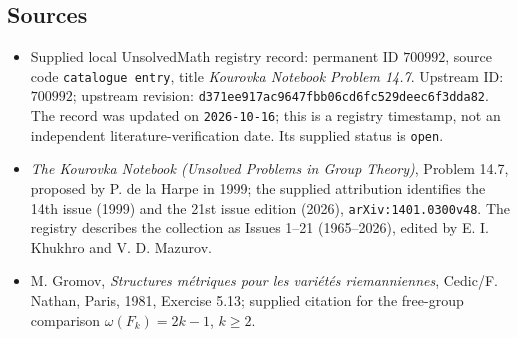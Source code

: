 \documentclass[11pt]{article}
\begin{document}
\subsection{Sources}
\begin{itemize}
\item Supplied local UnsolvedMath registry record: permanent ID \(700992\), source code \texttt{catalogue entry}, title \emph{Kourovka Notebook Problem 14.7}. Upstream ID: \(700992\); upstream revision: \texttt{d371ee917ac9647fbb06cd6fc529deec6f3dda82}. The record was updated on \texttt{2026-10-16}; this is a registry timestamp, not an independent literature-verification date. Its supplied status is \texttt{open}.
\item \emph{The Kourovka Notebook (Unsolved Problems in Group Theory)}, Problem 14.7, proposed by P. de la Harpe in 1999; the supplied attribution identifies the 14th issue (1999) and the 21st issue edition (2026), \texttt{arXiv:1401.0300v48}. The registry describes the collection as Issues 1--21 (1965--2026), edited by E. I. Khukhro and V. D. Mazurov.
\item M. Gromov, \emph{Structures m\'etriques pour les vari\'et\'es riemanniennes}, Cedic/F. Nathan, Paris, 1981, Exercise 5.13; supplied citation for the free-group comparison \(\omega(F_k)=2k-1\), \(k\geq 2\).
\end{itemize}
\end{document}
